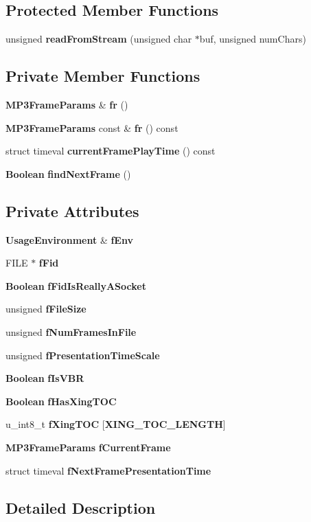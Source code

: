 \subsection*{Protected Member Functions}
\begin{DoxyCompactItemize}
\item 
unsigned {\bf read\+From\+Stream} (unsigned char $\ast$buf, unsigned num\+Chars)
\end{DoxyCompactItemize}
\subsection*{Private Member Functions}
\begin{DoxyCompactItemize}
\item 
{\bf M\+P3\+Frame\+Params} \& {\bf fr} ()
\item 
{\bf M\+P3\+Frame\+Params} const \& {\bf fr} () const 
\item 
struct timeval {\bf current\+Frame\+Play\+Time} () const 
\item 
{\bf Boolean} {\bf find\+Next\+Frame} ()
\end{DoxyCompactItemize}
\subsection*{Private Attributes}
\begin{DoxyCompactItemize}
\item 
{\bf Usage\+Environment} \& {\bf f\+Env}
\item 
F\+I\+L\+E $\ast$ {\bf f\+Fid}
\item 
{\bf Boolean} {\bf f\+Fid\+Is\+Really\+A\+Socket}
\item 
unsigned {\bf f\+File\+Size}
\item 
unsigned {\bf f\+Num\+Frames\+In\+File}
\item 
unsigned {\bf f\+Presentation\+Time\+Scale}
\item 
{\bf Boolean} {\bf f\+Is\+V\+B\+R}
\item 
{\bf Boolean} {\bf f\+Has\+Xing\+T\+O\+C}
\item 
u\+\_\+int8\+\_\+t {\bf f\+Xing\+T\+O\+C} [{\bf X\+I\+N\+G\+\_\+\+T\+O\+C\+\_\+\+L\+E\+N\+G\+T\+H}]
\item 
{\bf M\+P3\+Frame\+Params} {\bf f\+Current\+Frame}
\item 
struct timeval {\bf f\+Next\+Frame\+Presentation\+Time}
\end{DoxyCompactItemize}


\subsection{Detailed Description}


